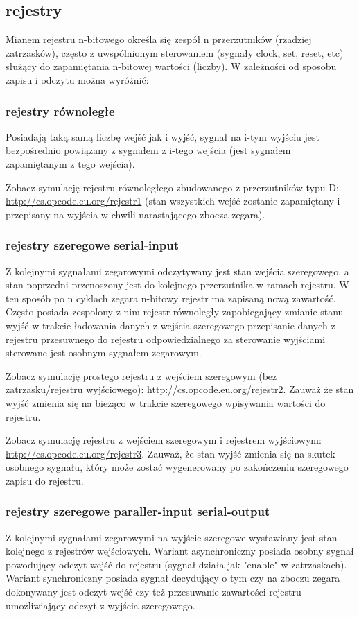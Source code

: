\subsection{rejestry}
Mianem rejestru n-bitowego określa się zespół n przerzutników (rzadziej zatrzasków), często z uwspólnionym sterowaniem (sygnały clock, set, reset, etc) służący do zapamiętania n-bitowej wartości (liczby). W zależności od sposobu zapisu i odczytu można wyróżnić:

\subsubsection{rejestry równoległe}
Posiadają taką samą liczbę wejść jak i wyjść, sygnał na i-tym wyjściu jest bezpośrednio powiązany z sygnałem z i-tego wejścia (jest sygnałem zapamiętanym z tego wejścia).

Zobacz symulację rejestru równoległego zbudowanego z przerzutników typu D: \url{http://cs.opcode.eu.org/rejestr1} (stan wszystkich wejść zostanie zapamiętany i przepisany na wyjścia w chwili narastającego zbocza zegara).

\subsubsection{rejestry szeregowe serial-input}
Z kolejnymi sygnałami zegarowymi odczytywany jest stan wejścia szeregowego, a stan poprzedni przenoszony jest do kolejnego przerzutnika w ramach rejestru. W ten sposób po n cyklach zegara n-bitowy rejestr ma zapisaną nową zawartość. Często posiada zespolony z nim rejestr równoległy zapobiegający zmianie stanu wyjść w trakcie ładowania danych z wejścia szeregowego przepisanie danych z rejestru przesuwnego do rejestru odpowiedzialnego za sterowanie wyjściami sterowane jest osobnym sygnałem zegarowym.

Zobacz symulację prostego rejestru z wejściem szeregowym (bez zatrzasku/rejestru wyjściowego): \url{http://cs.opcode.eu.org/rejestr2}.
Zauważ że stan wyjść zmienia się na bieżąco w trakcie szeregowego wpisywania wartości do rejestru.

Zobacz symulację rejestru z wejściem szeregowym i rejestrem wyjściowym: \url{http://cs.opcode.eu.org/rejestr3}.
Zauważ, że stan wyjść zmienia się na skutek osobnego sygnału, który może zostać wygenerowany po zakończeniu szeregowego zapisu do rejestru.

\subsubsection{rejestry szeregowe paraller-input serial-output}
Z kolejnymi sygnałami zegarowymi na wyjście szeregowe wystawiany jest stan kolejnego z rejestrów wejściowych. Wariant asynchroniczny posiada osobny sygnał powodujący odczyt wejść do rejestru (sygnał działa jak "enable" w zatrzaskach). Wariant synchroniczny posiada sygnał decydujący o tym czy na zboczu zegara dokonywany jest odczyt wejść czy też przesuwanie zawartości rejestru umożliwiający odczyt z wyjścia szeregowego.

